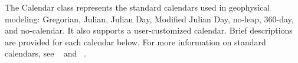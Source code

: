 
\label{sec:Calendar}
The Calendar class represents the standard calendars used in 
geophysical modeling:  Gregorian, Julian, Julian Day, Modified Julian Day, 
no-leap, 360-day, and no-calendar.  It also supports a user-customized 
calendar.  Brief descriptions are provided for each calendar below.  For more 
information on standard calendars, see ~\cite{Seidelman} and ~\cite{Meyer1}.
